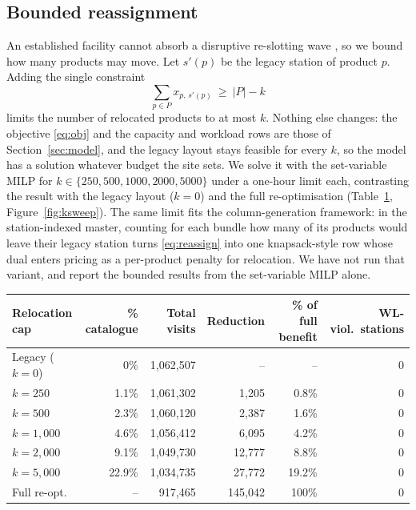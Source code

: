 \documentclass[]{interact}
\begin{document}
\subsection{Bounded reassignment}\label{sec:reassign}
An established facility cannot absorb a disruptive re-slotting wave \citep{chabot2024reassignment}, so we bound how many products may move. Let $s'(p)$ be the legacy station of product $p$. Adding the single constraint
\begin{equation}
\sum_{p \in P} x_{p,\,s'(p)} \ \ge\ |P| - k
\label{eq:reassign}
\end{equation}
limits the number of relocated products to at most $k$. Nothing else changes: the objective \eqref{eq:obj} and the capacity and workload rows are those of Section~\ref{sec:model}, and the legacy layout stays feasible for every $k$, so the model has a solution whatever budget the site sets. We solve it with the set-variable MILP for $k \in \{250, 500, 1000, 2000, 5000\}$ under a one-hour limit each, contrasting the result with the legacy layout ($k=0$) and the full re-optimisation (Table~\ref{tab:reassign}, Figure~\ref{fig:ksweep}). The same limit fits the column-generation framework: in the station-indexed master, counting for each bundle how many of its products would leave their legacy station turns \eqref{eq:reassign} into one knapsack-style row whose dual enters pricing as a per-product penalty for relocation. We have not run that variant, and report the bounded results from the set-variable MILP alone.

\begin{table}[H]
\centering
{}
{\small\begin{tabular*}{\textwidth}{@{\extracolsep{\fill}}lrrrrr@{}}
\toprule
Relocation cap & \% catalogue & Total visits & Reduction & \% of full benefit & WL-viol.\ stations \\
\midrule
Legacy ($k=0$) & 0\% & 1{,}062{,}507 & -- & -- & 0 \\
$k=250$        & 1.1\% & 1{,}061{,}302 & 1{,}205 & 0.8\% & 0 \\
$k=500$        & 2.3\% & 1{,}060{,}120 & 2{,}387 & 1.6\% & 0 \\
$k=1{,}000$    & 4.6\% & 1{,}056{,}412 & 6{,}095 & 4.2\% & 0 \\
$k=2{,}000$    & 9.1\% & 1{,}049{,}730 & 12{,}777 & 8.8\% & 0 \\
$k=5{,}000$    & 22.9\% & 1{,}034{,}735 & 27{,}772 & 19.2\% & 0 \\
Full re-opt.   & --     & 917{,}465 & 145{,}042 & 100\% & 0 \\
\bottomrule
\end{tabular*}}
\label{tab:reassign}
\end{table}
\end{document}
